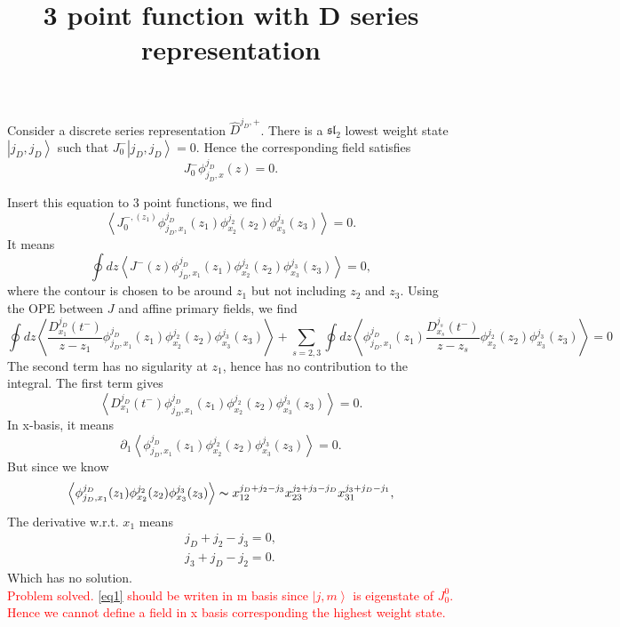 \documentclass[10pt,a4paper]{article}
\numberwithin{equation}{section}
\newcommand{\ket}[1]{\left| #1 \right\rangle}
\newcommand{\vev}[1]{\left< #1 \right>}
\begin{document}
\title{3 point function with D series representation}
\maketitle


Consider a discrete series representation $\hat{D}^{j_{D},+}$. There is a $\mathfrak{sl}_{2}$ lowest weight state $\ket{j_{D},j_{D}}$ such that 
$J^{-}_{0} \ket{j_{D},j_{D}} = 0$. Hence the corresponding field satisfies 
\begin{equation}
    J^{-}_{0} \phi^{j_{D}}_{j_{D},x}(z) = 0. \label{eq1}
\end{equation}

Insert this equation to 3 point functions, we find 
\begin{equation}
    \vev{J^{-,(z_{1})}_{0} \phi^{j_{D}}_{j_{D},x_{1}}(z_{1}) \phi^{j_{2}}_{x_{2}}(z_{2}) \phi^{j_{3}}_{x_{3}}(z_{3})} = 0.
\end{equation}
It means 
\begin{equation}
    \oint dz \vev{J^{-}(z) \phi^{j_{D}}_{j_{D},x_{1}}(z_{1}) \phi^{j_{2}}_{x_{2}}(z_{2}) \phi^{j_{3}}_{x_{3}}(z_{3})} = 0,
\end{equation}
where the contour is chosen to be around $z_{1}$ but not including $z_{2}$ and $z_{3}$. Using the OPE between $J$ and affine primary
fields, we find 
\begin{equation}
    \oint dz \vev{\frac{D^{j_{D}}_{x_{1}}(t^{-})}{z-z_{1}} \phi^{j_{D}}_{j_{D},x_{1}}(z_{1}) \phi^{j_{2}}_{x_{2}}(z_{2}) \phi^{j_{3}}_{x_{3}}(z_{3})} +
    \sum_{s=2,3} \oint dz \vev{ \phi^{j_{D}}_{j_{D},x_{1}}(z_{1}) \frac{D^{j_{s}}_{x_{s}}(t^{-})}{z-z_{s}} \phi^{j_{2}}_{x_{2}}(z_{2}) \phi^{j_{3}}_{x_{3}}(z_{3})} = 0
\end{equation}
The second term has no sigularity at $z_{1}$, hence has no contribution to the integral. The first term gives 
\begin{equation}
    \vev{D^{j_{D}}_{x_{1}}(t^{-}) \phi^{j_{D}}_{j_{D},x_{1}}(z_{1}) \phi^{j_{2}}_{x_{2}}(z_{2}) \phi^{j_{3}}_{x_{3}}(z_{3})} = 0.
\end{equation}
In x-basis, it means 
\begin{equation}
    \partial_{1}\vev{ \phi^{j_{D}}_{j_{D},x_{1}}(z_{1}) \phi^{j_{2}}_{x_{2}}(z_{2}) \phi^{j_{3}}_{x_{3}}(z_{3})} = 0.
\end{equation}
But since we know 
\begin{equation}
    \vev{ \phi^{j_{D}}_{j_{D},x_{1}}(z_{1}) \phi^{j_{2}}_{x_{2}}(z_{2}) \phi^{j_{3}}_{x_{3}}(z_{3})} \thicksim  x_{12}^{j_{D} + j_{2}-j_{3}}x_{23}^{j_{2}+j_{3} - j_{D}} x_{31}^{j_{3} + j_{D}-j_{1}},
\end{equation}
The derivative w.r.t. $x_{1}$ means
\begin{align}
    j_{D} + j_{2}-j_{3} = 0, \\
    j_{3} + j_{D}-j_{2} = 0.
\end{align}
Which has no solution.\\

\textcolor{red}{Problem solved. \ref{eq1} should be writen in m basis since $\ket{j,m}$ is eigenstate of $J^{0}_{0}$. Hence we 
cannot define a field in x basis corresponding the highest weight state.}
\end{document}
